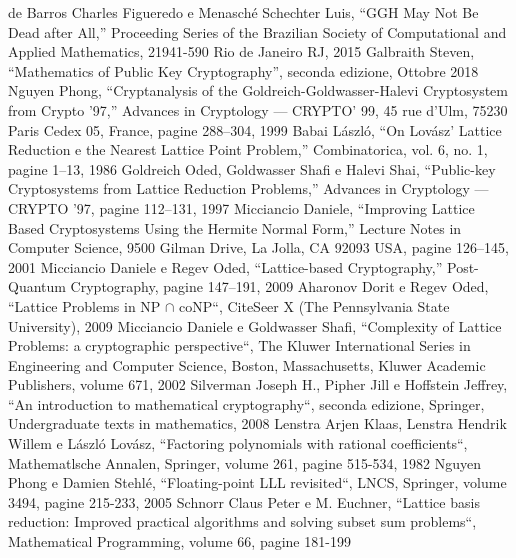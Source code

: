 \documentclass[a4paper,12pt]{report}
\theoremstyle{definition}
\begin{document}
%
%
%
%
\begin{thebibliography}{}
    de Barros Charles Figueredo e Menasché Schechter Luis, “GGH May Not Be Dead after All,” 
    Proceeding Series of the Brazilian Society of Computational and Applied Mathematics, 
    21941-590 Rio de Janeiro RJ, 2015
    Galbraith Steven, “Mathematics of Public Key Cryptography”, seconda edizione, Ottobre 2018
    Nguyen Phong, “Cryptanalysis of the Goldreich-Goldwasser-Halevi Cryptosystem from 
    Crypto ’97,” Advances in Cryptology — CRYPTO’ 99, 45 rue d’Ulm, 75230 Paris Cedex 05, 
    France, pagine 288–304, 1999
    Babai László, “On Lovász’ Lattice Reduction e the Nearest Lattice Point Problem,” 
    Combinatorica, vol. 6, no. 1, pagine 1–13, 1986
    Goldreich Oded, Goldwasser Shafi e Halevi Shai,  “Public-key Cryptosystems from 
    Lattice Reduction Problems,” Advances in Cryptology — CRYPTO ’97, pagine 112–131, 1997
    Micciancio Daniele,  “Improving Lattice Based Cryptosystems Using the Hermite 
    Normal Form,” Lecture Notes in Computer Science, 9500 Gilman Drive, La Jolla, 
    CA 92093 USA, pagine 126–145, 2001
    Micciancio Daniele e Regev Oded, “Lattice-based Cryptography,” Post-Quantum 
    Cryptography, pagine 147–191, 2009
    Aharonov Dorit e Regev Oded, “Lattice Problems in NP $\cap$ coNP“, 
    CiteSeer X (The Pennsylvania State University), 2009
    Micciancio Daniele e Goldwasser Shafi, 
    “Complexity of Lattice Problems: a cryptographic perspective“,
    The Kluwer International Series in Engineering and Computer Science, Boston, Massachusetts,
    Kluwer Academic Publishers, volume 671, 2002
    Silverman Joseph H., Pipher Jill e Hoffstein Jeffrey, “An introduction to mathematical cryptography“,
    seconda edizione, Springer, Undergraduate texts in mathematics, 2008
    Lenstra Arjen Klaas, Lenstra Hendrik Willem e László Lovász, 
    “Factoring polynomials with rational coefficients“, Mathematlsche Annalen, Springer, 
    volume 261, pagine 515-534, 1982
    Nguyen Phong e Damien Stehlé, “Floating-point LLL revisited“, LNCS, Springer, 
    volume 3494, pagine 215-233, 2005
    Schnorr Claus Peter e M. Euchner, 
    “Lattice basis reduction: Improved practical algorithms and solving subset sum problems“,
    Mathematical Programming, volume 66, pagine 181-199


   
\end{thebibliography}
% 
\end{document}
